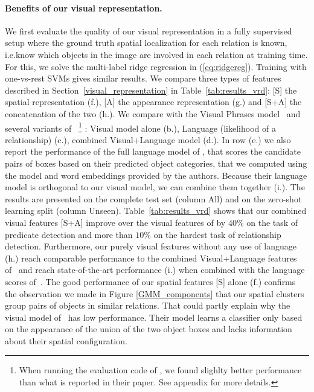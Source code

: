 \documentclass[10pt,twocolumn,letterpaper]{article}
\begin{document}
\paragraph{Benefits of our visual representation.}
We first evaluate the quality of our visual representation in a fully
supervised setup where the ground truth spatial localization for each
relation is known, i.e.\we know which objects in the image are
involved in each relation at training time. For this, we solve the
multi-label ridge regression in (\ref{eq:ridgereg}). Training with one-vs-rest SVMs gives similar results. We compare three types of features described in Section~\ref{visual_representation} in Table~\ref{tab:results_vrd}:
[S] the spatial representation (f.), [A] the appearance representation (g.) and [S+A]
the concatenation of the two (h.). We compare with the Visual Phrases model~\cite{Sadeghi2011} and several variants of~\cite{Lu16}
\footnote{When running the evaluation code of \cite{Lu16}, we found slighlty better performance than what is reported in their paper. See appendix for more details.}
: Visual model alone (b.), Language (likelihood of a relationship) (c.), combined Visual+Language model (d.). In row (e.) we also report the performance of the full language model of \cite{Lu16}, that scores the candidate pairs of boxes based on their predicted object categories, that we computed using the model and word embeddings provided by the authors.
Because their language model is orthogonal to our visual model, we can combine them together (i.).  
The results are presented on the complete test set (column All) and on the zero-shot learning split (column Unseen).
Table~\ref{tab:results_vrd} shows that our combined visual features [S+A] improve over the visual features of \cite{Lu16} by  $40\%$ on the task of predicate detection and more than $10\%$ on the hardest task of relationship detection. Furthermore, our purely visual features without any use of language (h.) reach comparable performance to the combined Visual+Language features of~\cite{Lu16} and reach state-of-the-art performance (i.) when combined with the language scores of~\cite{Lu16}. The good performance of our spatial features [S] alone (f.) confirms the observation we made in Figure \ref{GMM_components} that our spatial clusters group pairs of objects in similar relations. That could partly explain why the visual model of~\cite{Lu16} has low performance. Their model learns a classifier only based on the appearance of the union of the two object boxes and lacks information about their spatial configuration.
\end{document}
